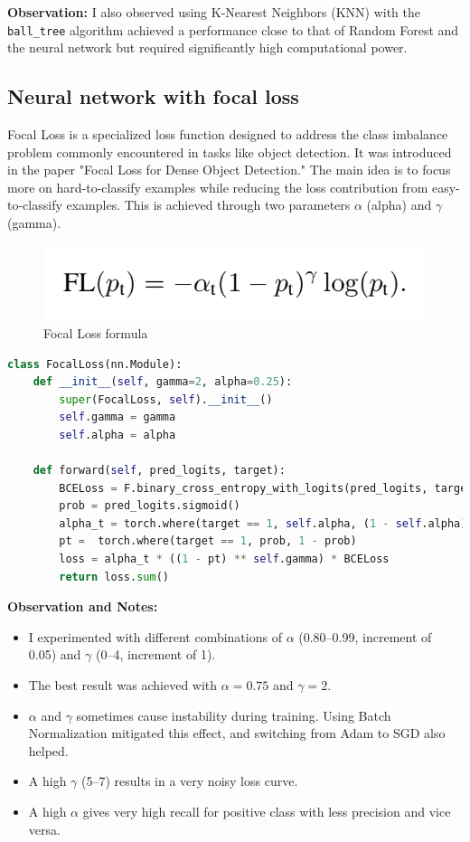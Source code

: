\noindent\textbf{Observation:}
\hfill \break
I also observed using K-Nearest Neighbors (KNN) with the \texttt{ball\_tree} algorithm achieved a performance close to that of Random Forest and the neural network but required significantly high computational power.


\newpage
\subsection{Neural network with focal loss}
Focal Loss is a specialized loss function designed to address the class imbalance problem commonly encountered in tasks like object detection. It was introduced in the paper "Focal Loss for Dense Object Detection." The main idea is to focus more on hard-to-classify examples while reducing the loss contribution from easy-to-classify examples. This is achieved through two parameters $\alpha$ (alpha) and $\gamma$ (gamma).

\begin{figure}[h]
    \centering
    \includegraphics[width=1\linewidth]{Focal_Loss.png}
    \caption{Focal Loss formula}
    \label{fig:Focal Loss formula}
\end{figure}


\begin{lstlisting}[language=Python, caption=My Focal Loss Implementation in PyTorch]
class FocalLoss(nn.Module):
    def __init__(self, gamma=2, alpha=0.25):
        super(FocalLoss, self).__init__()
        self.gamma = gamma
        self.alpha = alpha

    def forward(self, pred_logits, target):
        BCELoss = F.binary_cross_entropy_with_logits(pred_logits, target, reduction='none')
        prob = pred_logits.sigmoid()
        alpha_t = torch.where(target == 1, self.alpha, (1 - self.alpha))
        pt =  torch.where(target == 1, prob, 1 - prob)
        loss = alpha_t * ((1 - pt) ** self.gamma) * BCELoss
        return loss.sum()
\end{lstlisting}

\noindent\textbf{Observation and Notes:}

\begin{itemize}
    \item I experimented with different combinations of $\alpha$ (0.80--0.99, increment of 0.05) and $\gamma$ (0--4, increment of 1).
    \item The best result was achieved with $\alpha = 0.75$ and $\gamma = 2$.
    \item $\alpha$ and $\gamma$ sometimes cause instability during training. Using Batch Normalization mitigated this effect, and switching from Adam to SGD also helped.
    \item A high $\gamma$ (5--7) results in a very noisy loss curve.
    \item A high $\alpha$ gives very high recall for positive class with less precision and vice versa.   
\end{itemize}

